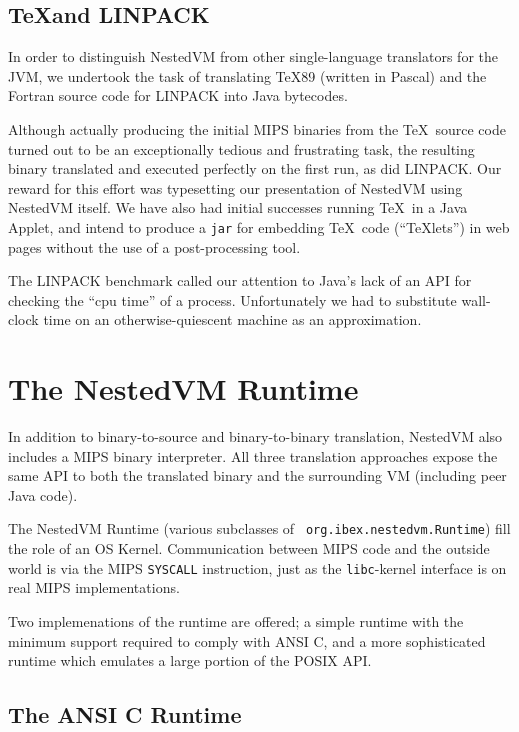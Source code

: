 \documentclass{acmconf}
\begin{document}
\subsection{\TeX and LINPACK}

In order to distinguish NestedVM from other single-language
translators for the JVM, we undertook the task of translating \TeX 89
(written in Pascal) and the Fortran source code for LINPACK into Java
bytecodes.

Although actually producing the initial MIPS binaries from the \TeX\
source code turned out to be an exceptionally tedious and frustrating
task, the resulting binary translated and executed perfectly on the
first run, as did LINPACK.  Our reward for this effort was typesetting
our presentation of NestedVM using NestedVM itself.  We have also had
initial successes running \TeX\ in a Java Applet, and intend to
produce a {\tt jar} for embedding \TeX\ code (``\TeX lets'') in web
pages without the use of a post-processing tool.

The LINPACK benchmark called our attention to Java's lack of an API
for checking the ``cpu time'' of a process.  Unfortunately we had to
substitute wall-clock time on an otherwise-quiescent machine as an
approximation.



\section{The NestedVM Runtime}

In addition to binary-to-source and binary-to-binary translation,
NestedVM also includes a MIPS binary interpreter.  All three
translation approaches expose the same API to both the translated
binary and the surrounding VM (including peer Java code).

The NestedVM Runtime (various subclasses of {\tt
org.ibex.nestedvm.Runtime}) fill the role of an OS Kernel.
Communication between MIPS code and the outside world is via the MIPS
{\tt SYSCALL} instruction, just as the {\tt libc}-kernel interface is
on real MIPS implementations.

Two implemenations of the runtime are offered; a simple runtime with
the minimum support required to comply with ANSI C, and a more
sophisticated runtime which emulates a large portion of the POSIX API.

\subsection{The ANSI C Runtime}
\end{document}
